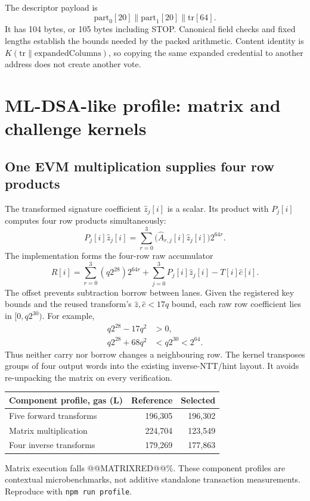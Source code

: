 \documentclass[11pt,a4paper]{article}
\newcommand{\local}{\textbf{L}}
\begin{document}
The descriptor payload is
\begin{equation*}
 \mathrm{part}_0[20]\parallel\mathrm{part}_1[20]\parallel\mathrm{tr}[64].
\end{equation*}
It has 104 bytes, or 105 bytes including STOP. Canonical field checks and
fixed lengths establish the bounds needed by the packed arithmetic. Content
identity is $K(\mathrm{tr}\parallel\mathrm{expandedColumns})$, so copying
the same expanded credential to another address does not create another vote.

\newpage
\section{ML-DSA-like profile: matrix and challenge kernels}
\subsection{One EVM multiplication supplies four row products}
The transformed signature coefficient $\widehat z_j[i]$ is a scalar. Its
product with $P_j[i]$ computes four row products simultaneously:
\begin{equation}
 P_j[i]\widehat z_j[i]
 =\sum_{r=0}^{3}\big(\widehat A_{r,j}[i]\widehat z_j[i]\big)2^{64r}.
\end{equation}
The implementation forms the four-row raw accumulator
\begin{equation}
 R[i]=\sum_{r=0}^{3}(q2^{28})2^{64r}
       +\sum_{j=0}^{3}P_j[i]\widehat z_j[i]-T[i]\widehat c[i].
\end{equation}
The offset prevents subtraction borrow between lanes. Given the registered
key bounds and the reused transform's $\widehat z,\widehat c<17q$ bound,
each raw row coefficient lies in $[0,q2^{30})$. For example,
\begin{align*}
 q2^{28}-17q^2 &> 0,\\
 q2^{28}+68q^2 &< q2^{30}<2^{64}.
\end{align*}
Thus neither carry nor borrow changes a neighbouring row. The kernel
transposes groups of four output words into the existing inverse-NTT/hint
layout. It avoids re-unpacking the matrix on every verification.

\begin{tabularx}{\linewidth}{Yrr}
\toprule
\textbf{Component profile, gas (\local)} & \textbf{Reference} & \textbf{Selected}\\
\midrule
Five forward transforms & 196,305 & 196,302\\
Matrix multiplication & 224,704 & 123,549\\
Four inverse transforms & 179,269 & 177,863\\
\bottomrule
\end{tabularx}
{\small Matrix execution falls @@MATRIXRED@@\%. These
component profiles are contextual microbenchmarks, not additive standalone
transaction measurements. Reproduce with \texttt{npm run profile}.}
\end{document}
